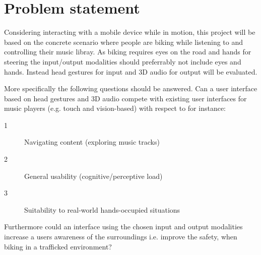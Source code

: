 \section{Problem statement}
Considering interacting with a mobile device while in motion, this project will be based on the concrete scenario where people are biking while listening to and controlling their music libray. As biking requires eyes on the road and hands for steering the input/output modalities should preferrably not include eyes and hands. Instead head gestures for input and 3D audio for output will be evaluated.

More specifically the following questions should be answered. Can a user interface based on head gestures and 3D audio compete with existing user interfaces for music players (e.g. touch and vision-based) with respect to for instance:
\begin{description}
\item[1] Navigating content (exploring music tracks)
\item[2] General usability (cognitive/perceptive load)
\item[3] Suitability to real-world hands-occupied situations
\end{description}
Furthermore could an interface using the chosen input and output modalities increase a users awareness of the surroundings i.e. improve the safety, when biking in a trafficked environment?



